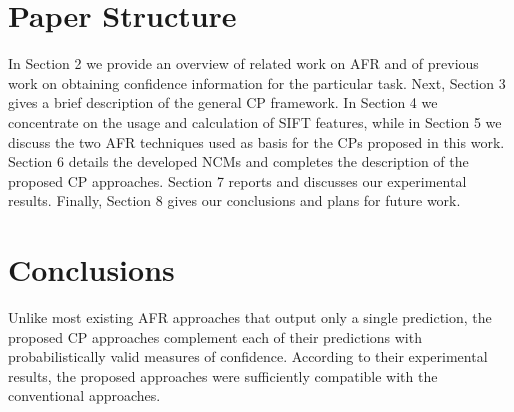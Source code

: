 \documentclass[10pt,a4paper]{article}
\begin{document}
\section{Paper Structure}
In Section 2 we provide an overview
of related work on AFR and of previous work on obtaining confidence information for the
particular task. Next, Section 3 gives a brief description of the general CP framework. In
Section 4 we concentrate on the usage and calculation of SIFT features, while in Section
5 we discuss the two AFR techniques used as basis for the CPs proposed in this work.
Section 6 details the developed NCMs and completes the description of the proposed CP
approaches. Section 7 reports and discusses our experimental results. Finally, Section 8
gives our conclusions and plans for future work.

\section{Conclusions}
Unlike most existing AFR approaches that output only a single prediction, the proposed CP approaches complement each of their predictions with probabilistically valid measures of confidence. According to their experimental results, the proposed approaches were sufficiently compatible with the conventional approaches.

\medskip
 
\printbibliography
\end{document}
